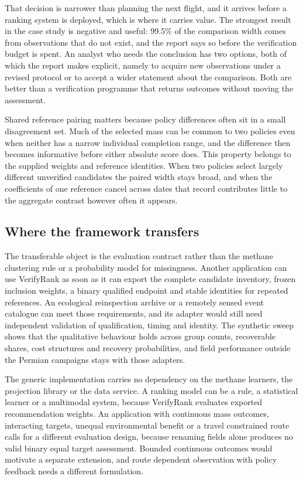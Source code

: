 \documentclass[a4paper,fleqn,longmktitle]{cas-sc}
\begin{document}
That decision is narrower than planning the next flight, and it arrives before a ranking system is deployed, which is where it carries value. The strongest result in the case study is negative and useful: 99.5\% of the comparison width comes from observations that do not exist, and the report says so before the verification budget is spent. An analyst who needs the conclusion has two options, both of which the report makes explicit, namely to acquire new observations under a revised protocol or to accept a wider statement about the comparison. Both are better than a verification programme that returns outcomes without moving the assessment.

Shared reference pairing matters because policy differences often sit in a small disagreement set. Much of the selected mass can be common to two policies even when neither has a narrow individual completion range, and the difference then becomes informative before either absolute score does. This property belongs to the supplied weights and reference identities. When two policies select largely different unverified candidates the paired width stays broad, and when the coefficients of one reference cancel across dates that record contributes little to the aggregate contrast however often it appears.

\subsection{Where the framework transfers}\label{sec:transfer}

The transferable object is the evaluation contract rather than the methane clustering rule or a probability model for missingness. Another application can use VerifyRank as soon as it can export the complete candidate inventory, frozen inclusion weights, a binary qualified endpoint and stable identities for repeated references. An ecological reinspection archive or a remotely sensed event catalogue can meet those requirements, and its adapter would still need independent validation of qualification, timing and identity. The synthetic sweep shows that the qualitative behaviour holds across group counts, recoverable shares, cost structures and recovery probabilities, and field performance outside the Permian campaigns stays with those adapters.

The generic implementation carries no dependency on the methane learners, the projection library or the data service. A ranking model can be a rule, a statistical learner or a multimodal system, because VerifyRank evaluates exported recommendation weights. An application with continuous mass outcomes, interacting targets, unequal environmental benefit or a travel constrained route calls for a different evaluation design, because renaming fields alone produces no valid binary equal target assessment. Bounded continuous outcomes would motivate a separate extension, and route dependent observation with policy feedback needs a different formulation.
\end{document}
